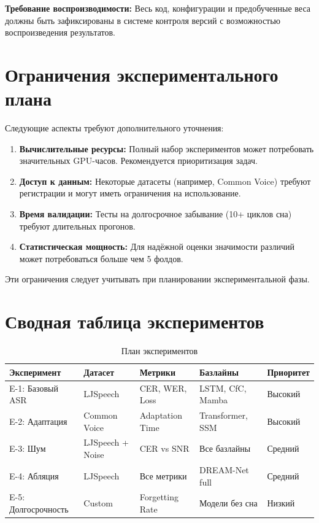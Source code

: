 \textbf{Требование воспроизводимости:} Весь код, конфигурации и предобученные веса должны быть зафиксированы в системе контроля версий с возможностью воспроизведения результатов.

\section{Ограничения экспериментального плана}

Следующие аспекты требуют дополнительного уточнения:

\begin{enumerate}
    \item \textbf{Вычислительные ресурсы:} Полный набор экспериментов может потребовать значительных GPU-часов. Рекомендуется приоритизация задач.
    
    \item \textbf{Доступ к данным:} Некоторые датасеты (например, Common Voice) требуют регистрации и могут иметь ограничения на использование.
    
    \item \textbf{Время валидации:} Тесты на долгосрочное забывание (10+ циклов сна) требуют длительных прогонов.
    
    \item \textbf{Статистическая мощность:} Для надёжной оценки значимости различий может потребоваться больше чем 5 фолдов.
\end{enumerate}

Эти ограничения следует учитывать при планировании экспериментальной фазы.

\section{Сводная таблица экспериментов}

\begin{table}[h]
\centering
\caption{План экспериментов}
\label{tab:experiments_summary}
\begin{tabular}{lp{3cm}p{3cm}lp{2cm}}
\toprule
\textbf{Эксперимент} & \textbf{Датасет} & \textbf{Метрики} & \textbf{Базлайны} & \textbf{Приоритет} \\
\midrule
E-1: Базовый ASR & LJSpeech & CER, WER, Loss & LSTM, CfC, Mamba & Высокий \\
E-2: Адаптация & Common Voice & Adaptation Time & Transformer, SSM & Высокий \\
E-3: Шум & LJSpeech + Noise & CER vs SNR & Все базлайны & Средний \\
E-4: Абляция & LJSpeech & Все метрики & DREAM-Net full & Средний \\
E-5: Долгосрочность & Custom & Forgetting Rate & Модели без сна & Низкий \\
\bottomrule
\end{tabular}
\end{table}
